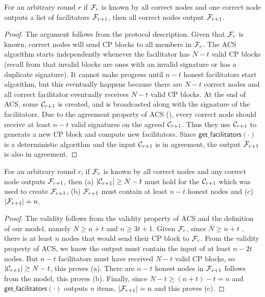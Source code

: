 \begin{lemma}
\label{lemma:agreement}
For an arbitrary round $r$
if $\mathcal{F}_{r}$ is known by all correct nodes and one correct node outputs a list of facilitators $\mathcal{F}_{r+1}$,
then all correct nodes output $\mathcal{F}_{r+1}$.
\end{lemma}
\begin{proof}
The argument follows from the protocol description.
Given that $\mathcal{F}_r$ is known,
correct nodes will send CP blocks to all members in $\mathcal{F}_r$.
The ACS algorithm starts independently whenever the facilitator has $N - t$ valid CP blocks
(recall from  that invalid blocks are ones with an invalid signature or has a duplicate signature).
It cannot make progress until $n-t$ honest facilitators start algorithm,
but this eventually happens because there are $N - t$ correct nodes and all correct facilitator eventually receives $N -t$ valid CP blocks.
At the end of ACS, some $\mathcal{C}_{r+1}$ is created, and is broadcasted along with the signature of the facilitators.
Due to the agreement property of ACS (),
every correct node should receive at least $n - t$ valid signatures on the agreed $\mathcal{C}_{r+1}$.
Thus they use $\mathcal{C}_{r+1}$ to generate a new CP block and compute new facilitators.
Since $\textsf{get\_facilitators}(\cdot)$ is a deterministic algorithm and the input $\mathcal{C}_{r+1}$ is in agreement, the output $\mathcal{F}_{r+1}$ is also in agreement.
\end{proof}

\begin{lemma}
\label{lemma:validity}
For an arbitrary round $r$,
if $\mathcal{F}_r$ is known by all correct nodes and any correct node outputs $\mathcal{F}_{r+1}$,
then (a) $|\mathcal{C}_{r+1}| \ge N - t$ must hold for the $\mathcal{C}_{r+1}$ which was used to create $\mathcal{F}_{r+1}$,
(b) $\mathcal{F}_{r+1}$ must contain at least $n - t$ honest nodes and
(c) $|\mathcal{F}_{r+1}| = n$.
\end{lemma}
\begin{proof}
The validity follows from the validity property of ACS and the definition of our model,
namely $N \ge n + t$ and $n \ge 3t + 1$.
Given $\mathcal{F}_r$, since $N \ge n + t$ , there is at least $n$ nodes that would send their CP block to $\mathcal{F}_r$.
From the validity property of ACS, we know the output must contain the input of at least $n - 2t$ nodes.
But $n -t$ facilitators must have received $N - t$ valid CP blocks, so $|\mathcal{C}_{r+1}| \ge N-t$, this proves (a).
There are $n-t$ honest nodes in $\mathcal{F}_{r+1}$ follows from the model, this proves (b).
Finally, since $N-t \ge (n+t) -t = n$ and $\textsf{get\_facilitators}(\cdot)$ outputs $n$ items, $|\mathcal{F}_{r+1}| = n$ and this proves (c).
\end{proof}

